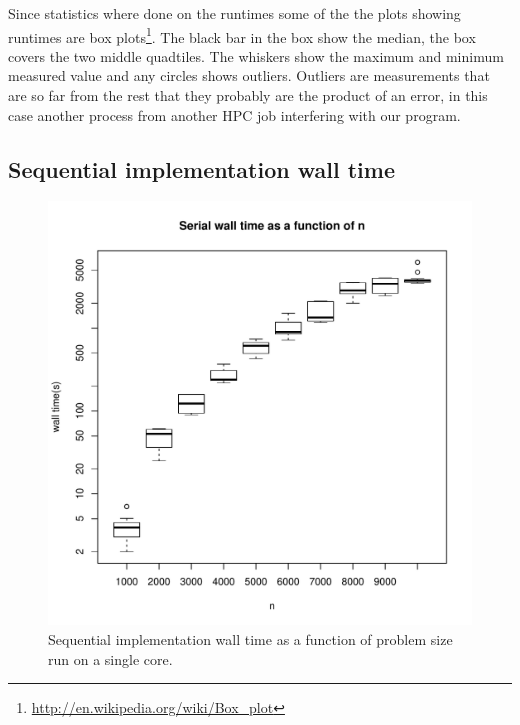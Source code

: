 \documentclass{article}
\begin{document}
Since statistics where done on the runtimes some of the the plots showing runtimes 
are box plots\footnote{\url{http://en.wikipedia.org/wiki/Box_plot}}. The black bar
in the box show the median, the box covers the two middle quadtiles. The whiskers show the maximum
and minimum measured value and any circles shows outliers. Outliers are measurements
that are so far from the rest that they probably are the product of an error,
in this case another process from another HPC job interfering with our program.

\subsection{Sequential implementation wall time}
\begin{figure}[H]
  \begin{center}
    \includegraphics[width=12cm]{../analysis/serial_walltime.pdf}
  \end{center}
  \caption{Sequential implementation wall time as a function of problem size run on a single core.}
  \label{serial_walltime}
\end{figure}
\end{document}
